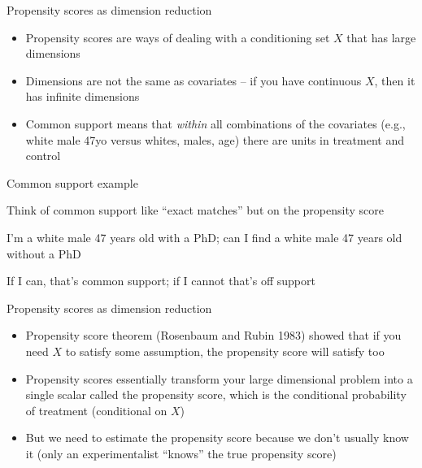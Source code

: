 \documentclass{beamer}
\begin{document}
\begin{frame}{Propensity scores as dimension reduction}

\begin{itemize}

\item Propensity scores are ways of dealing with a conditioning set $X$ that has large dimensions
\item Dimensions are not the same as covariates -- if you have continuous $X$, then it has infinite dimensions
\item Common support means that \emph{within} all combinations of the covariates (e.g., white male 47yo versus whites, males, age) there are units in treatment and control

\end{itemize}

\end{frame}

\begin{frame}{Common support example}

Think of common support like ``exact matches'' but on the propensity score

\bigskip

I'm a white male 47 years old with a PhD; can I find a white male 47 years old without a PhD

\bigskip

If I can, that's common support; if I cannot that's off support

\end{frame}


\begin{frame}{Propensity scores as dimension reduction}

\begin{itemize}

\item Propensity score theorem (Rosenbaum and Rubin 1983) showed that if you need $X$ to satisfy some assumption, the propensity score will satisfy too
\item Propensity scores essentially transform your large dimensional problem into a single scalar called the propensity score, which is the conditional probability of treatment (conditional on $X$)
\item But we need to estimate the propensity score because we don't usually know it (only an experimentalist ``knows'' the true propensity score)

\end{itemize}

\end{frame}
\end{document}
